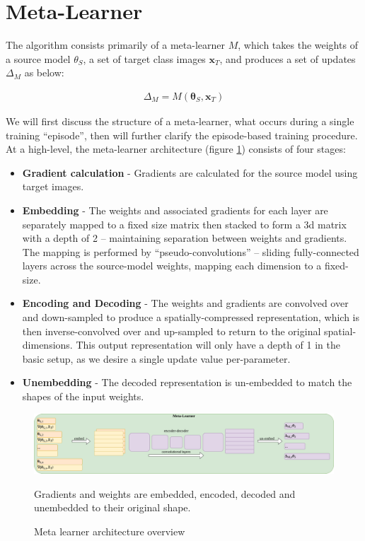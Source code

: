 \documentclass{report}
\begin{document}
\section{Meta-Learner} \label{meta-learner-sub}
The algorithm consists primarily of a meta-learner $M$, which takes the weights of a source model $\theta_S$, a set of target class images $\bm{x}_T$, and produces a set of updates $\Delta_M$ as below:

	\begin{align}
	\Delta_M = M(\bm{\theta}_S, \bm{x}_T)
	\end{align}

We will first discuss the structure of a meta-learner, what occurs during a single training ``episode'', then will further clarify the episode-based training procedure. At a high-level, the meta-learner architecture (figure \ref{fig:ml:3}) consists of four stages:
\begin{itemize}
	\item \textbf{Gradient calculation} - Gradients are calculated for the source model using target images.
	\item \textbf{Embedding} - The weights and associated gradients for each layer are separately mapped to a fixed size matrix then stacked to form a 3d matrix with a depth of 2 -- maintaining separation between weights and gradients. The mapping is performed by ``pseudo-convolutions'' -- sliding fully-connected layers across the source-model weights, mapping each dimension to a fixed-size.
	\item \textbf{Encoding and Decoding} - The weights and gradients are convolved over and down-sampled to produce a spatially-compressed representation, which is then inverse-convolved over and up-sampled to return to the original spatial-dimensions. This output representation will only have a depth of 1 in the basic setup, as we desire a single update value per-parameter.
	\item \textbf{Unembedding} - The decoded representation is un-embedded to match the shapes of the input weights.
\end{itemize}
\begin{figure}[h!]
	\centering
	\includegraphics[width=17cm]{metalearnerarchitecture}
	\caption{Meta learner architecture overview}
	\label{fig:ml:3}
	Gradients and weights are embedded, encoded, decoded and unembedded to their original shape.
\end{figure}
\end{document}
